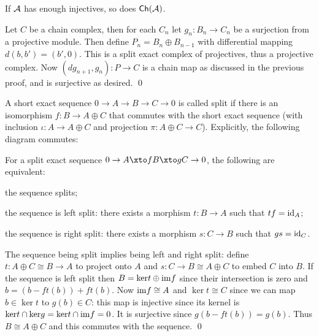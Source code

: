 \eproof

\bcoro

    If ${{\cal A}}$ has enough injectives, so does ${\sf Ch}({{\cal A}})$.

\ecoro

\bproof

    Let $C$ be a chain complex, then for each $C_n$ let $g_n\colon B_n\to C_n$ be a surjection from a projective module.
    Then define $P_n=B_n\oplus B_{n-1}$ with differential mapping $d(b,b')=(b',0)$.
    This is a split exact complex of projectives, thus a projective complex.
    Now $(dg_{n+1},g_n)\colon P\to C$ is a chain map as discussed in the previous proof, and is surjective as desired.
    \qed

\eproof

\bdefn

    A short exact sequence $0\to A\to B\to C\to0$ is called {\emphcolor split} if there is an isomorphism $f\colon B\to A\oplus C$ that commutes with the short
    exact sequence (with inclusion $\iota\colon A\to A\oplus C$ and projection $\pi\colon A\oplus C\to C$).
    Explicitly, the following diagram commutes:

    \centerline{}

\edefn

\blemm[title=Splitting lemma]

    For a split exact sequence $0\to A\xto fB\xto gC\to0$, the following are equivalent:
    \benum
        \item the sequence splits;
        \item the sequence is {\emphcolor left split}: there exists a morphism $t\colon B\to A$ such that $tf={\rm id}_A$;
        \item the sequence is {\emphcolor right split}: there exists a morphism $s\colon C\to B$ such that $gs={\rm id}_C$.
    \eenum

\elemm

\bproof

    The sequence being split implies being left and right split: define $t\colon A\oplus C\cong B\to A$ to project onto $A$ and $s\colon C\to B\cong A\oplus C$ to
    embed $C$ into $B$.
    If the sequence is left split then $B={\rm ker} t\oplus{\rm im} f$ since their intersection is zero and $b=(b-ft(b))+ft(b)$.
    Now ${\rm im} f\cong A$ and $\ker t\cong C$ since we can map $b\in\ker t$ to $g(b)\in C$: this map is injective since its kernel is ${\rm ker} t\cap{\rm ker} g={\rm ker} t\cap{\rm im} f=0$.
    It is surjective since $g(b-ft(b))=g(b)$.
    Thus $B\cong A\oplus C$ and this commutes with the sequence.
    \qed

